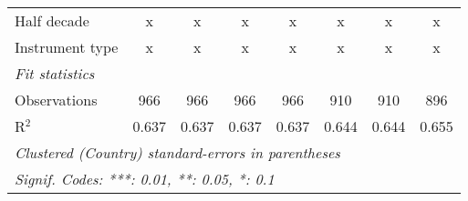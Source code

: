 \begin{tabular}{lccccccc}
   Half decade                                                                                     & x            & x            & x            & x            & x            & x            & x\\  
   Instrument type                                                                                 & x            & x            & x            & x            & x            & x            & x\\  
   \midrule \emph{Fit statistics}\\
   Observations                                                                                    & 966          & 966          & 966          & 966          & 910          & 910          & 896\\  
   R$^2$                                                                                           & 0.637        & 0.637        & 0.637        & 0.637        & 0.644        & 0.644        & 0.655\\  
   \midrule
   \multicolumn{8}{l}{\emph{Clustered (Country) standard-errors in parentheses}}\\
   \multicolumn{8}{l}{\emph{Signif. Codes: ***: 0.01, **: 0.05, *: 0.1}}\\
\end{tabular}
\par\endgroup


